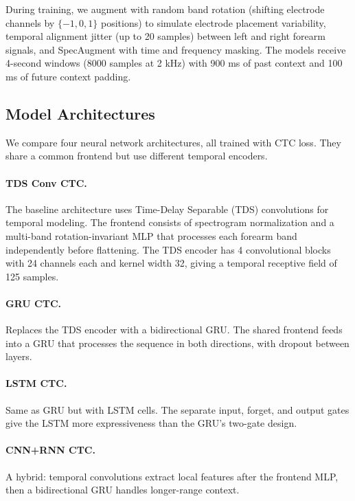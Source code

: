 \documentclass{article}
\begin{document}
During training, we augment with random band rotation (shifting electrode channels by $\{-1, 0, 1\}$ positions) to simulate electrode placement variability, temporal alignment jitter (up to 20 samples) between left and right forearm signals, and SpecAugment with time and frequency masking. The models receive 4-second windows (8000 samples at 2 kHz) with 900 ms of past context and 100 ms of future context padding.

\subsection{Model Architectures}

We compare four neural network architectures, all trained with CTC loss. They share a common frontend but use different temporal encoders.

\paragraph{TDS Conv CTC.} The baseline architecture uses Time-Delay Separable (TDS) convolutions for temporal modeling. The frontend consists of spectrogram normalization and a multi-band rotation-invariant MLP that processes each forearm band independently before flattening. The TDS encoder has 4 convolutional blocks with 24 channels each and kernel width 32, giving a temporal receptive field of 125 samples.

\paragraph{GRU CTC.} Replaces the TDS encoder with a bidirectional GRU. The shared frontend feeds into a GRU that processes the sequence in both directions, with dropout between layers.

\paragraph{LSTM CTC.} Same as GRU but with LSTM cells. The separate input, forget, and output gates give the LSTM more expressiveness than the GRU's two-gate design.

\paragraph{CNN+RNN CTC.} A hybrid: temporal convolutions extract local features after the frontend MLP, then a bidirectional GRU handles longer-range context.
\end{document}
